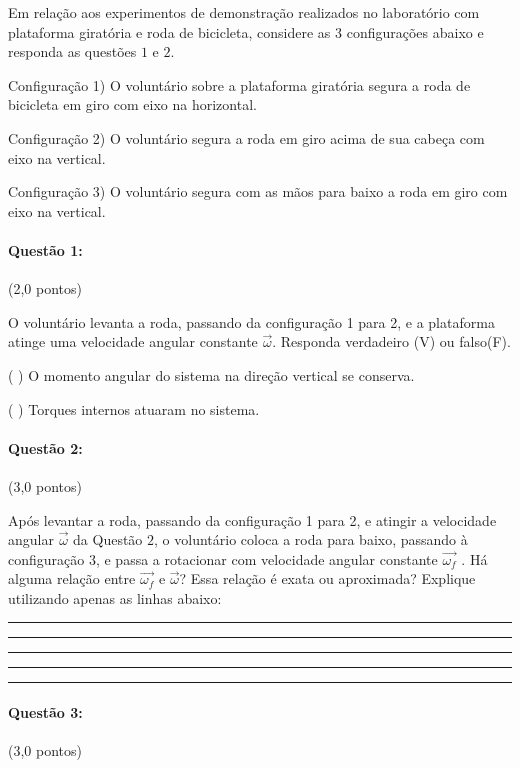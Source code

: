 \documentclass[12pt,a4paper]{article}
\begin{document}
Em relação aos experimentos de demonstração realizados no laboratório com plataforma giratória e roda de bicicleta, considere as 3 configurações abaixo e responda as questões $1$ e $2$.

Configuração 1) O voluntário sobre a plataforma giratória segura a roda de bicicleta em
giro com eixo na horizontal.

Configuração 2) O voluntário segura a roda em giro acima de sua cabeça com eixo na
vertical.

Configuração 3) O voluntário segura com as mãos para baixo a roda em giro com eixo na
vertical.

\paragraph{Questão 1:} (2,0 pontos)

O voluntário levanta a roda, passando da configuração 1 para 2, e a
plataforma atinge uma velocidade angular constante $\overrightarrow{\omega}$. Responda verdadeiro (V) ou falso(F).

( ) O momento angular do sistema na direção vertical se conserva.

( ) Torques internos atuaram no sistema.

\paragraph{Questão 2:} (3,0 pontos)

Após levantar a roda, passando da configuração 1 para 2, e atingir a
velocidade angular $\overrightarrow{\omega}$ da Questão $2$, o voluntário coloca a roda para baixo, passando à configuração
3, e passa a rotacionar com velocidade angular constante $\overrightarrow{\omega_f}$ . Há alguma relação entre $\overrightarrow{\omega_f}$ e $\overrightarrow{\omega}$?
Essa relação é exata ou aproximada? Explique utilizando apenas as linhas abaixo:
\\

\rule{13cm}{0.4pt}

\rule{13cm}{0.4pt}

\rule{13cm}{0.4pt}

\rule{13cm}{0.4pt}

\rule{13cm}{0.4pt}

\paragraph{Questão 3:} (3,0 pontos)
\end{document}
